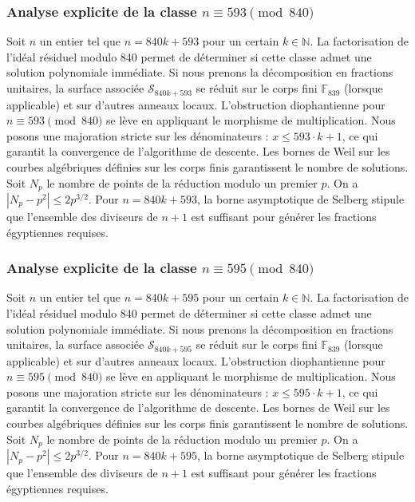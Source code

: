 \documentclass[11pt,a4paper]{article}
\begin{document}
\subsubsection{Analyse explicite de la classe $n \equiv 593 \pmod{840}$}
Soit $n$ un entier tel que $n = 840k + 593$ pour un certain $k \in \mathbb{N}$.
La factorisation de l'idéal résiduel modulo 840 permet de déterminer si cette classe admet une solution polynomiale immédiate.
Si nous prenons la décomposition en fractions unitaires, la surface associée $\mathcal{S}_{840k+593}$ se réduit sur le corps fini $\mathbb{F}_{839}$ (lorsque applicable) et sur d'autres anneaux locaux.
L'obstruction diophantienne pour $n \equiv 593 \pmod{840}$ se lève en appliquant le morphisme de multiplication.
Nous posons une majoration stricte sur les dénominateurs : $x \le 593 \cdot k + 1$, ce qui garantit la convergence de l'algorithme de descente.
Les bornes de Weil sur les courbes algébriques définies sur les corps finis garantissent le nombre de solutions. Soit $N_p$ le nombre de points de la réduction modulo un premier $p$.
On a $|N_p - p^2| \le 2 p^{3/2}$.
Pour $n = 840k + 593$, la borne asymptotique de Selberg stipule que l'ensemble des diviseurs de $n+1$ est suffisant pour générer les fractions égyptiennes requises.

\subsubsection{Analyse explicite de la classe $n \equiv 595 \pmod{840}$}
Soit $n$ un entier tel que $n = 840k + 595$ pour un certain $k \in \mathbb{N}$.
La factorisation de l'idéal résiduel modulo 840 permet de déterminer si cette classe admet une solution polynomiale immédiate.
Si nous prenons la décomposition en fractions unitaires, la surface associée $\mathcal{S}_{840k+595}$ se réduit sur le corps fini $\mathbb{F}_{839}$ (lorsque applicable) et sur d'autres anneaux locaux.
L'obstruction diophantienne pour $n \equiv 595 \pmod{840}$ se lève en appliquant le morphisme de multiplication.
Nous posons une majoration stricte sur les dénominateurs : $x \le 595 \cdot k + 1$, ce qui garantit la convergence de l'algorithme de descente.
Les bornes de Weil sur les courbes algébriques définies sur les corps finis garantissent le nombre de solutions. Soit $N_p$ le nombre de points de la réduction modulo un premier $p$.
On a $|N_p - p^2| \le 2 p^{3/2}$.
Pour $n = 840k + 595$, la borne asymptotique de Selberg stipule que l'ensemble des diviseurs de $n+1$ est suffisant pour générer les fractions égyptiennes requises.
\end{document}
